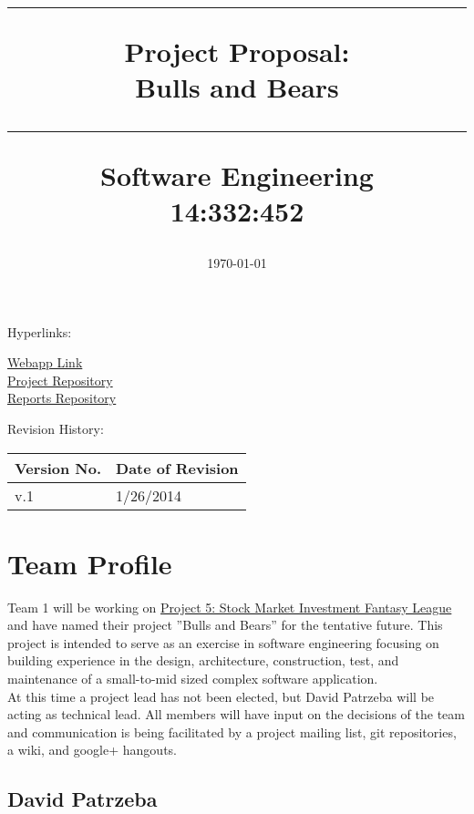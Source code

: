 \documentclass[11pt,letterpaper,oneside]{memoir}
\title{%
{\color{color2} \hrule}\vspace{1cm}
\Huge{\color{color1} Project Proposal:\\Bulls and Bears %
\vspace{1cm}
{\color{color2} \hrule}\vspace{1cm}}
\Large{ \color{color2} Software Engineering\\
14:332:452}
}
\author{\huge{\color{color0}Team 1:\\}\vskip.1in
\Large{\href{mailto:david.patrzeba@gmail.com}{David Patrzeba}\\
\href{mailto:eric.jacob.10@gmail.com}{Eric Jacob}\\
\href{mailto:evanarbeitman@gmail.edu}{Evan Arbeitman}\\
\href{mailto:christopher.a.mancuso@gmail.com}{Christopher Mancuso}\\
\href{mailto:dkarivalis@gmail.edu}{David Karivalis}\\
\href{mailto:jdlziegler@gmail.com}{Jesse Ziegler}}}
\date{\today}
\begin{document}
\titleGM    %

Hyperlinks:\\
\begin{center}
\href{http://192.241.248.91}{Webapp Link}\\
\href{https://github.com/dkarivalis/SEP_SMIFL}{Project Repository}\\
\href{https://github.com/dkarivalis/SEP_SMIFL_reports}{Reports Repository}\\
\end{center}

Revision History:
\begin{longtable}{|p{1.6in}|p{2.6in}|}
\hline
{\large \color{color1}Version No.}&{\large \color{color1}Date of Revision} \\ \hline
v.1&1/26/2014  \\ \hline 
\end{longtable}

\pagebreak  %
\tableofcontents %

\chapter{Team Profile}

Team 1 will be working on \href{http://ece.rutgers.edu/~marsic/books/SE/projects/}
{Project 5: Stock Market Investment Fantasy League} and have named their project
''Bulls and Bears'' for the tentative future. This project is intended to serve
as an exercise in software engineering focusing on building experience in the design,
architecture, construction, test, and maintenance of a small-to-mid sized complex
software application.\\

At this time a project lead has not been elected, but David Patrzeba will be acting
as technical lead.  All members will have input on the decisions of the team and
communication is being facilitated by a project mailing list, git repositories,
a wiki, and google+ hangouts.\\

\section{David Patrzeba}
\end{document}
